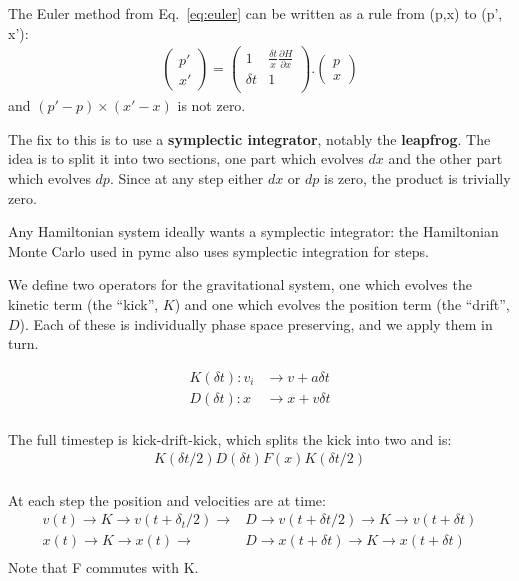 \documentclass[12pt]{article}
\begin{document}
The Euler method from Eq.~\ref{eq:euler} can be written as a rule from (p,x) to (p', x'):
\begin{align}
\begin{pmatrix}
 p' \\
 x'
\end{pmatrix}
=
\begin{pmatrix}
1 & \frac{\delta t}{x} \frac{\partial H}{\partial x} \\
\delta t & 1 \\
\end{pmatrix}
.
\begin{pmatrix}
 p \\
 x
\end{pmatrix}
\end{align}
and $(p' - p)\times (x' - x)$ is not zero.

The fix to this is to use a \textbf{symplectic integrator}, notably the \textbf{leapfrog}. The idea is to split it into two sections, one part which evolves $dx$ and the other part which evolves $dp$. Since at any step either $dx$ or $dp$ is zero, the product is trivially zero.

Any Hamiltonian system ideally wants a symplectic integrator: the Hamiltonian Monte Carlo used in pymc also uses symplectic integration for steps.

We define two operators for the gravitational system, one which evolves the kinetic term (the ``kick'', $K$) and one which evolves the position term (the ``drift'', $D$). Each of these is individually phase space preserving, and we apply them in turn.

\begin{align}
 K(\delta t): v_i &\to v + a \delta t \\
 D(\delta t): x &\to x + v \delta t \\
\end{align}

The full timestep is kick-drift-kick, which splits the kick into two and is:
\begin{align}
K(\delta t/2) D(\delta t) F(x) K(\delta t/2) \\
\end{align}

At each step the position and velocities are at time:
\begin{align}
v(t) \to K \to v(t+\delta_t/2) \to &D \to v(t + \delta t/2) \to K \to v(t + \delta t) \\
x(t) \to K \to x(t) \to &D \to x(t + \delta t) \to K \to x(t + \delta t) \\
\end{align}
Note that F commutes with K.
\end{document}
